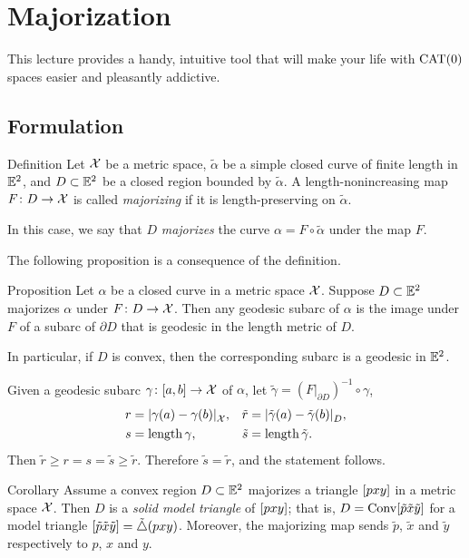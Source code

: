 \chapter{Majorization}\label{sec:resh-kirz}

This lecture provides a handy, intuitive tool that will make your life with $\mathrm{CAT}(0)$ spaces easier and pleasantly addictive.

\section{Formulation}

\begin{thm}{Definition}\label{def:majorize}
Let $\mathcal{X}$ be a metric space,
$\tilde \alpha$ be a simple closed curve of finite length  in $\mathbb{E}^2$,
and $D\subset\mathbb{E}^2$ be a closed region bounded by $\tilde \alpha$.
A length-nonincreasing map $F\colon D\to\mathcal{X}$ is called \emph{majorizing} if it is length-preserving on $\tilde \alpha$.

In this case, we say that $D$ \emph{majorizes} the curve $\alpha=F\circ\tilde \alpha$ under the map $F$.
\end{thm}

The following proposition is a consequence of the definition.

\begin{thm}{Proposition}
\label{prop:majorize-geodesic} 
Let  $\alpha$  be a closed curve in a metric space $\mathcal{X}$.
Suppose $D\subset\mathbb{E}^2$ majorizes $\alpha$ under $F\colon D \to \mathcal{X}$.  
Then any geodesic subarc of $\alpha$ is the image under $F$ of a subarc of $\partial D$ that is geodesic in the length metric of $D$.

In particular, if $D$ is convex, then the corresponding subarc is a geodesic in $\mathbb{E}^2$.
\end{thm}

Given a geodesic subarc $\gamma\colon[a,b]\to\mathcal{X}$ of $\alpha$,
let $\tilde \gamma = (F|_{\partial D})^{-1}\circ\gamma$,
\begin{align*}
r&=\dist{\gamma(a)}{\gamma(b)}{\spc{X}},
&
\tilde r&=\dist{\tilde \gamma(a)}{\tilde \gamma(b)}{D},
\\
s&=\length \gamma,
&
\tilde s&= \length \tilde \gamma.
\end{align*}
Then $\tilde r\ge r = s =\tilde s\ge\tilde r$.
Therefore $\tilde s=\tilde r$, and the statement follows.
\qeds

\begin{thm}{Corollary}\label{cor:maj-triangle}
Assume a convex region $D\subset \mathbb{E}^2$ majorizes a triangle $[pxy]$ in a metric space $\mathcal{X}$.
Then $D$ is a \emph{solid model triangle} of $[pxy]$;
that is,
$D=\mathop{\rm Conv}\nolimits[\tilde p\tilde x\tilde y]$ for a model triangle $[\tilde p\tilde x\tilde y]=\tilde\triangle(p x y)$.
Moreover, the majorizing map sends  $\tilde p$, $\tilde x$ and $\tilde y$ respectively to $p$, $x$ and $y$.
\end{thm}


